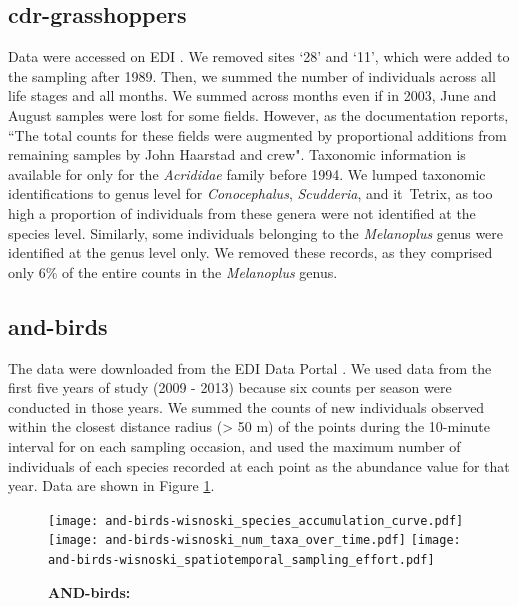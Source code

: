 \documentclass[11pt, oneside]{article}
\begin{document}
\subsection{cdr-grasshoppers}
Data were accessed on EDI \citep{cdr-grasshoppers}.
We removed sites `28' and `11', which were added to the sampling after 1989. 
Then, we summed the number of individuals across all life stages and all months. 
We summed across months even if in 2003, June and August samples were lost for some fields. 
However, as the documentation reports, ``The total counts for these fields were augmented by proportional additions from remaining samples by John Haarstad and crew".
Taxonomic information is available for only for the {\it Acrididae} family before 1994. 
We lumped taxonomic identifications to genus level for {\it Conocephalus}, {\it Scudderia}, and {it\ Tetrix}, as too high a proportion of individuals from these genera were not identified at the species level. 
Similarly, some individuals belonging to the {\it Melanoplus} genus were identified at the genus level only. 
We removed these records, as they comprised only 6$\%$ of the entire counts in the {\it Melanoplus} genus.




\subsection {and-birds}
The data were downloaded from the EDI Data Portal \citep{and-birds}.
We used data from the first five years of study (2009 - 2013) because six counts per season were conducted in those years.
We summed the counts of new individuals observed within the closest distance radius (> 50 m)  of the points during the 10-minute interval for on each sampling occasion, and used the maximum number of individuals of each species recorded at each point as the abundance value for that year.
Data are shown in Figure \ref{and-birds}.

\begin{figure}[h!]
\centering
\texttt{[image: and-birds-wisnoski\_species\_accumulation\_curve.pdf]}
\texttt{[image: and-birds-wisnoski\_num\_taxa\_over\_time.pdf]}
\texttt{[image: and-birds-wisnoski\_spatiotemporal\_sampling\_effort.pdf]}
\caption{{\bf AND-birds:} }
\label{and-birds}
\end{figure}
\end{document}
